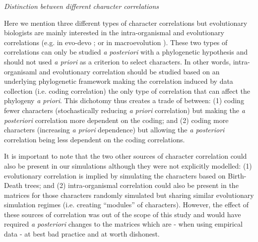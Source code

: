 \documentclass[12pt,letterpaper]{article}
\renewcommand{\subsection}[1]{%
\bigskip
\begin{center}
\begin{large}
\normalfont\itshape #1
\end{large}
\end{center}}
\begin{document}
\subsection{Distinction between different character correlations}
Here we mention three different types of character correlations but evolutionary biologists are mainly interested in the intra-organismal and evolutionary correlations (e.g. in evo-devo \citealt{goswami2006morphological}; or in macroevolution \citealt{fitzjohn2014much}).
These two types of correlations can only be studied \textit{a posteriori} with a phylogenetic hypothesis and should not used \textit{a priori} as a criterion to select characters.
In other words, intra-organisaml and evolutionary correlation should be studied based on an underlying phylogenetic framework making the correlation induced by data collection (i.e. coding correlation) the only type of correlation that can affect the phylogeny \textit{a priori}.
This dichotomy thus creates a trade of between: (1) coding fewer characters (stochastically reducing \textit{a priori} correlation) but making the \textit{a posteriori} correlation more dependent on the coding;
and (2) coding more characters (increasing \textit{a priori} dependence) but allowing the \textit{a posteriori} correlation being less dependent on the coding correlations.

It is important to note that the two other sources of character correlation could also be present in our simulations although they were not explicitly modelled:
(1) evolutionary correlation is implied by simulating the characters based on Birth-Death trees;
and (2) intra-organismal correlation could also be present in the matrices for those characters randomly simulated but sharing similar evolutionary simulation regimes (i.e. creating ``modules'' of characters).
However, the effect of these sources of correlation was out of the scope of this study and would have required \textit{a posteriori} changes to the matrices which are - when using empirical data - at best bad practice and at worth dishonest.
\end{document}
